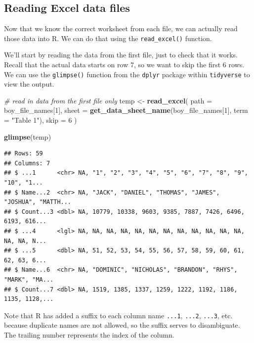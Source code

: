 \documentclass[
]{book}
\newenvironment{Shaded}{\begin{snugshade}}{\end{snugshade}}
\newcommand{\CommentTok}[1]{\textcolor[rgb]{0.56,0.35,0.01}{\textit{#1}}}
\newcommand{\DataTypeTok}[1]{\textcolor[rgb]{0.13,0.29,0.53}{#1}}
\newcommand{\DecValTok}[1]{\textcolor[rgb]{0.00,0.00,0.81}{#1}}
\newcommand{\KeywordTok}[1]{\textcolor[rgb]{0.13,0.29,0.53}{\textbf{#1}}}
\newcommand{\NormalTok}[1]{#1}
\newcommand{\StringTok}[1]{\textcolor[rgb]{0.31,0.60,0.02}{#1}}
\begin{document}
\hypertarget{reading-excel-data-files}{%
\subsection{Reading Excel data files}\label{reading-excel-data-files}}

Now that we know the correct worksheet from each file, we can actually read those data into R. We can do that using the \texttt{read\_excel()} function.

We'll start by reading the data from the first file, just to check that it works. Recall that the actual data starts on row 7, so we want to skip the first 6 rows. We can use the \texttt{glimpse()} function from the \texttt{dplyr} package within \texttt{tidyverse} to view the output.

\begin{Shaded}
\begin{Highlighting}[]
\CommentTok{\# read in data from the first file only}
\NormalTok{temp \textless{}{-}}\StringTok{ }\KeywordTok{read\_excel}\NormalTok{(}
  \DataTypeTok{path =}\NormalTok{ boy\_file\_names[}\DecValTok{1}\NormalTok{],}
  \DataTypeTok{sheet =} \KeywordTok{get\_data\_sheet\_name}\NormalTok{(boy\_file\_names[}\DecValTok{1}\NormalTok{], }\DataTypeTok{term =} \StringTok{"Table 1"}\NormalTok{),}
  \DataTypeTok{skip =} \DecValTok{6}
\NormalTok{)}

\KeywordTok{glimpse}\NormalTok{(temp)}
\end{Highlighting}
\end{Shaded}

\begin{verbatim}
## Rows: 59
## Columns: 7
## $ ...1      <chr> NA, "1", "2", "3", "4", "5", "6", "7", "8", "9", "10", "1...
## $ Name...2  <chr> NA, "JACK", "DANIEL", "THOMAS", "JAMES", "JOSHUA", "MATTH...
## $ Count...3 <dbl> NA, 10779, 10338, 9603, 9385, 7887, 7426, 6496, 6193, 616...
## $ ...4      <lgl> NA, NA, NA, NA, NA, NA, NA, NA, NA, NA, NA, NA, NA, NA, N...
## $ ...5      <dbl> NA, 51, 52, 53, 54, 55, 56, 57, 58, 59, 60, 61, 62, 63, 6...
## $ Name...6  <chr> NA, "DOMINIC", "NICHOLAS", "BRANDON", "RHYS", "MARK", "MA...
## $ Count...7 <dbl> NA, 1519, 1385, 1337, 1259, 1222, 1192, 1186, 1135, 1128,...
\end{verbatim}

Note that R has added a suffix to each column name \texttt{...1}, \texttt{...2}, \texttt{...3}, etc. because duplicate names are not allowed, so the suffix serves to disambiguate. The trailing number represents the index of the column.
\end{document}
